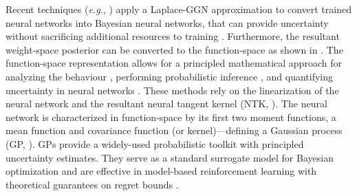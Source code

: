 \documentclass{article}
\makeatletter
\newcommand{\eg}{\textit{e.g.\@}\xspace}
\makeatother
\begin{document}
Recent techniques (\eg, \cite{ritter2018kfac,khan2019approximate,daxberger2021laplace,fortuin2021bayesian,immer2021scalable}) apply a Laplace-GGN approximation to convert trained neural networks into Bayesian neural networks, that can provide uncertainty without sacrificing additional resources to training \cite{foong2019between}. Furthermore, the resultant weight-space posterior can be converted to the function-space as shown in \cite{khan2019approximate, immer2021improving}. The function-space representation allows for a principled mathematical approach for analyzing the behaviour \cite{cho2009kernel,meronen2020stationary}, performing probabilistic inference \cite{khan2019approximate}, and quantifying uncertainty in neural networks \cite{foong2019between}. These methods rely on the linearization of the neural network and the resultant neural tangent kernel (NTK, \cite{jacot2018neural}). The neural network is characterized in function-space by its first two moment functions, a mean function and covariance function (or kernel)---defining a Gaussian process (GP, \cite{rasmussen2006gaussian}). GPs provide a widely-used probabilistic toolkit with principled uncertainty estimates. They serve as a standard surrogate model for Bayesian optimization \citep{garnett_bayesoptbook_2022} and are effective in model-based reinforcement learning \citep{deisenroth2011pilco} with theoretical guarantees on regret bounds \citep{srinivas2009gaussian}.  
\end{document}
